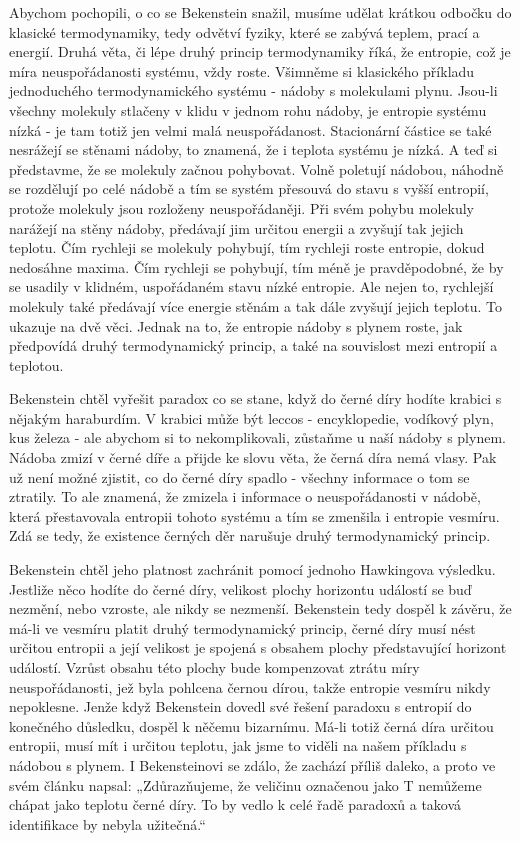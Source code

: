   Abychom pochopili, o co se Bekenstein snažil, musíme udělat krátkou odbočku do klasické
  termodynamiky, tedy odvětví fyziky, které se zabývá teplem, prací a energií. Druhá věta, či lépe
  druhý princip termodynamiky říká, že entropie, což je míra neuspořádanosti systému, vždy roste.
  Všimněme si klasického příkladu jednoduchého termodynamického systému - nádoby s molekulami plynu.
  Jsou-li všechny molekuly stlačeny v klidu v jednom rohu nádoby, je entropie systému nízká - je tam
  totiž jen velmi malá neuspořádanost. Stacionární částice se také nesrážejí se stěnami nádoby, to
  znamená, že i teplota systému je nízká. A teď si představme, že se molekuly začnou pohybovat.
  Volně poletují nádobou, náhodně se rozdělují po celé nádobě a tím se systém přesouvá do stavu s
  vyšší entropií, protože molekuly jsou rozloženy neuspořádaněji. Při svém pohybu molekuly narážejí
  na stěny nádoby, předávají jim určitou energii a zvyšují tak jejich teplotu. Čím rychleji se
  molekuly pohybují, tím rychleji roste entropie, dokud nedosáhne maxima. Čím rychleji se pohybují,
  tím méně je pravděpodobné, že by se usadily v klidném, uspořádaném stavu nízké entropie. Ale nejen
  to, rychlejší molekuly také předávají více energie stěnám a tak dále zvyšují jejich teplotu. To
  ukazuje na dvě věci. Jednak na to, že entropie nádoby s plynem roste, jak předpovídá druhý
  termodynamický princip, a také na souvislost mezi entropií a teplotou. 
  
  Bekenstein chtěl vyřešit paradox co se stane, když do černé díry hodíte krabici s nějakým
  haraburdím. V krabici může být leccos - encyklopedie, vodíkový plyn, kus železa - ale abychom si
  to nekomplikovali, zůstaňme u naší nádoby s plynem. Nádoba zmizí v černé díře a přijde ke slovu
  věta, že černá díra nemá vlasy. Pak už není možné zjistit, co do černé díry spadlo - všechny
  informace o tom se ztratily. To ale znamená, že zmizela i informace o neuspořádanosti v nádobě,
  která přestavovala entropii tohoto systému a tím se zmenšila i entropie vesmíru. Zdá se tedy, že
  existence černých děr narušuje druhý termodynamický princip. 
  
  Bekenstein chtěl jeho platnost zachránit pomocí jednoho Hawkingova výsledku. Jestliže něco hodíte
  do černé díry, velikost plochy horizontu událostí se buď nezmění, nebo vzroste, ale nikdy se
  nezmenší. Bekenstein tedy dospěl k závěru, že má-li ve vesmíru platit druhý termodynamický
  princip, černé díry musí nést určitou entropii a její velikost je spojená s obsahem plochy
  představující horizont událostí. Vzrůst obsahu této plochy bude kompenzovat ztrátu míry
  neuspořádanosti, jež byla pohlcena černou dírou, takže entropie vesmíru nikdy nepoklesne. Jenže
  když Bekenstein dovedl své řešení paradoxu s entropií do konečného důsledku, dospěl k něčemu
  bizarnímu. Má-li totiž černá díra určitou entropii, musí mít i určitou teplotu, jak jsme to viděli
  na našem příkladu s nádobou s plynem. I Bekensteinovi se zdálo, že zachází příliš daleko, a proto
  ve svém článku napsal: „Zdůrazňujeme, že veličinu označenou jako T nemůžeme chápat jako teplotu
  černé díry. To by vedlo k celé řadě paradoxů a taková identifikace by nebyla užitečná.“
  
